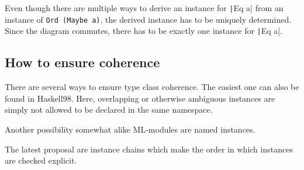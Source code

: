 
Even though there are multiple ways to derive an instance for \texttt|Eq a| from an instance of \texttt{Ord (Maybe a)}, the derived instance has to be uniquely determined.
Since the diagram commutes, there has to be exactly one instance for \texttt|Eq a|.

\subsection{How to ensure coherence}

There are several ways to ensure type class coherence.
The easiest one can also be found in Haskell98.
Here, overlapping or otherwise ambiguous instances are simply not allowed to be declared in the same namespace.

Another possibility somewhat alike ML-modules are named instances.

The latest proposal are instance chains which make the order in which instances are checked explicit. \cite{morris2010instance}
